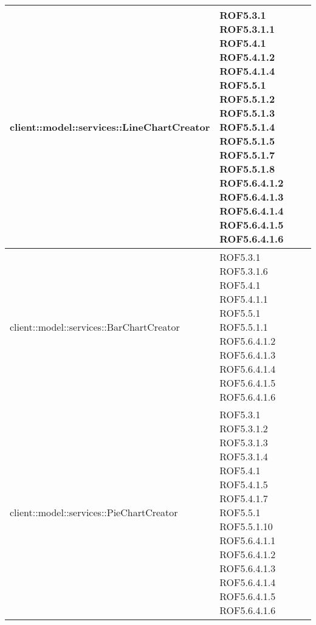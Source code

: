 \begin{center}
\begin{longtable}{| p{11cm} | p{2.5cm} |}
client::model::services::LineChartCreator & ROF5.3.1 \newline ROF5.3.1.1 \newline ROF5.4.1 \newline ROF5.4.1.2 \newline ROF5.4.1.4 \newline ROF5.5.1 \newline ROF5.5.1.2 \newline ROF5.5.1.3 \newline ROF5.5.1.4 \newline ROF5.5.1.5 \newline ROF5.5.1.7 \newline ROF5.5.1.8 \newline ROF5.6.4.1.2 \newline ROF5.6.4.1.3 \newline ROF5.6.4.1.4 \newline ROF5.6.4.1.5 \newline ROF5.6.4.1.6 \\
\hline
client::model::services::BarChartCreator & ROF5.3.1 \newline ROF5.3.1.6 \newline ROF5.4.1 \newline ROF5.4.1.1 \newline ROF5.5.1 \newline ROF5.5.1.1 \newline ROF5.6.4.1.2 \newline ROF5.6.4.1.3 \newline ROF5.6.4.1.4 \newline ROF5.6.4.1.5 \newline ROF5.6.4.1.6 \\
\hline
client::model::services::PieChartCreator & ROF5.3.1 \newline ROF5.3.1.2 \newline ROF5.3.1.3 \newline ROF5.3.1.4 \newline ROF5.4.1 \newline ROF5.4.1.5 \newline ROF5.4.1.7 \newline ROF5.5.1 \newline ROF5.5.1.10 \newline ROF5.6.4.1.1 \newline ROF5.6.4.1.2 \newline ROF5.6.4.1.3 \newline ROF5.6.4.1.4 \newline ROF5.6.4.1.5 \newline ROF5.6.4.1.6 \\

\end{longtable}
\end{center}
